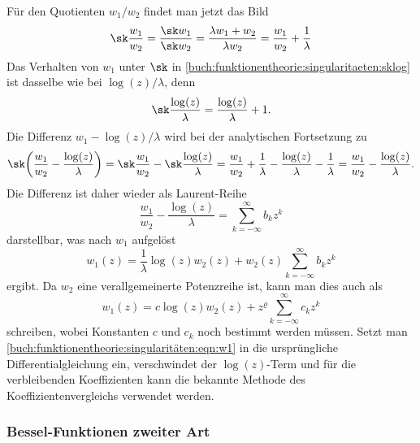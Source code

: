 Für den Quotienten $w_1/w_2$ findet man jetzt das Bild
\begin{equation}
\sk \frac{w_1}{w_2}
=
\frac{\sk w_1}{\sk w_2}
=
\frac{\lambda w_1+w_2}{\lambda w_2}
=
\frac{w_1}{w_2} + \frac{1}{\lambda}
\label{buch:funktionentheorie:singularitaeten:sklog}
\end{equation}
Das Verhalten von $w_1$ unter $\sk$ in
\eqref{buch:funktionentheorie:singularitaeten:sklog}
ist dasselbe wie bei $\log(z)/\lambda$, denn
\[
\sk \frac{\log(z)}{\lambda}
=
\frac{\log(z)}{\lambda} + 1.
\]
Die Differenz $w_1-\log(z)/\lambda$ wird bei der analytischen
Fortsetzung zu
\[
\sk\biggl(
\frac{w_1}{w_2}-\frac{\log(z)}{\lambda}
\biggr)
=
\sk \frac{w_1}{w_2} - \sk\frac{\log(z)}{\lambda}
=
\frac{w_1}{w_2} + \frac{1}{\lambda}
-
\frac{\log(z)}{\lambda}
-\frac{1}{\lambda}
=
\frac{w_1}{w_2}-\frac{\log(z)}{\lambda}.
\]
Die Differenz ist daher wieder als Laurent-Reihe
\[
\frac{w_1}{w_2}-\frac{\log(z)}{\lambda}
=
\sum_{k=-\infty}^\infty b_kz^k
\]
darstellbar, was nach $w_1$ aufgelöst 
\[
w_1(z)
=
\frac{1}{\lambda} \log(z) w_2(z)
+
w_2(z) \sum_{k=-\infty}^\infty b_kz^k
\]
ergibt.
Da $w_2$ eine verallgemeinerte Potenzreihe ist, kann man dies auch
als
\begin{equation}
w_1(z)
=
c \log(z) w_2(z)
+
z^{\varrho}
\sum_{k=-\infty}^{\infty} c_kz^k
\label{buch:funktionentheorie:singularitäten:eqn:w1}
\end{equation}
schreiben, wobei Konstanten $c$ und $c_k$ noch bestimmt werden müssen.
Setzt man
\eqref{buch:funktionentheorie:singularitäten:eqn:w1}
in die ursprüngliche Differentialgleichung ein, verschwindet der
$\log(z)$-Term und für die verbleibenden Koeffizienten kann die
bekannte Methode des Koeffizientenvergleichs verwendet werden.

\subsubsection{Bessel-Funktionen zweiter Art}



